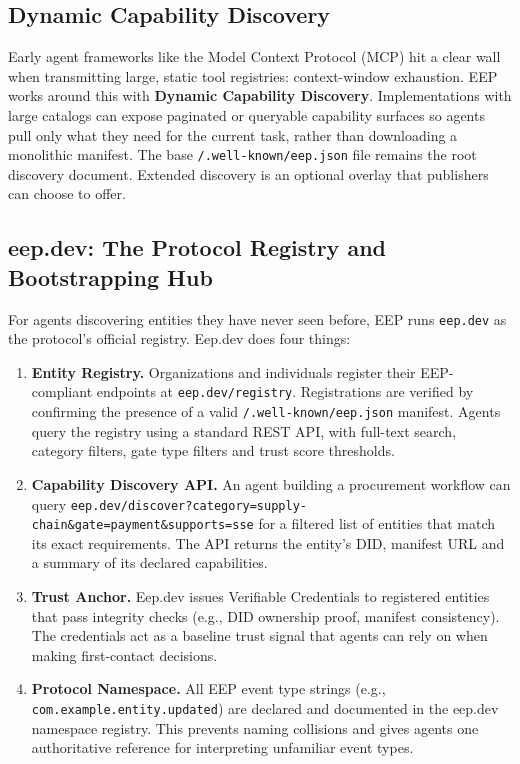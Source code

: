 \documentclass[12pt,a4paper]{article}
\begin{document}
\subsection{Dynamic Capability Discovery}

Early agent frameworks like the Model Context Protocol (MCP) hit a clear wall when transmitting large, static tool registries: context-window exhaustion. EEP works around this with \textbf{Dynamic Capability Discovery}. Implementations with large catalogs can expose paginated or queryable capability surfaces so agents pull only what they need for the current task, rather than downloading a monolithic manifest. The base \nolinkurl{/.well-known/eep.json} file remains the root discovery document. Extended discovery is an optional overlay that publishers can choose to offer.


\subsection{eep.dev: The Protocol Registry and Bootstrapping Hub}

For agents discovering entities they have never seen before, EEP runs \texttt{eep.dev} as the protocol's official registry. Eep.dev does four things:

\begin{enumerate}
    \item \textbf{Entity Registry.} Organizations and individuals register their EEP-compliant endpoints at \texttt{eep.dev/registry}. Registrations are verified by confirming the presence of a valid \texttt{/.well-known/eep.json} manifest. Agents query the registry using a standard REST API, with full-text search, category filters, gate type filters and trust score thresholds.

    \item \textbf{Capability Discovery API.} An agent building a procurement workflow can query \texttt{eep.dev/discover?category=supply-chain\&gate=payment\&supports=sse} for a filtered list of entities that match its exact requirements. The API returns the entity's DID, manifest URL and a summary of its declared capabilities.

    \item \textbf{Trust Anchor.} Eep.dev issues Verifiable Credentials to registered entities that pass integrity checks (e.g., DID ownership proof, manifest consistency). The credentials act as a baseline trust signal that agents can rely on when making first-contact decisions.

    \item \textbf{Protocol Namespace.} All EEP event type strings (e.g., \texttt{com.example.entity.updated}) are declared and documented in the eep.dev namespace registry. This prevents naming collisions and gives agents one authoritative reference for interpreting unfamiliar event types.
\end{enumerate}
\end{document}
